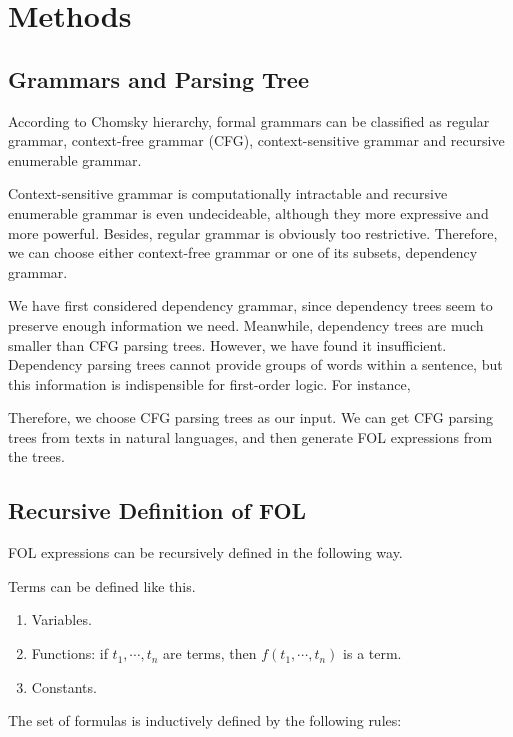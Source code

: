 \documentclass{article}
\begin{document}
\section{Methods}{
	\subsection{Grammars and Parsing Tree}{
		According to Chomsky hierarchy, formal grammars can be classified as regular grammar, context-free grammar (CFG), context-sensitive grammar and recursive enumerable grammar. 

		Context-sensitive grammar is computationally intractable and recursive enumerable grammar is even undecideable, although they more expressive and more powerful. Besides, regular grammar is obviously too restrictive. Therefore, we can choose either context-free grammar or one of its subsets, dependency grammar. 

		We have first considered dependency grammar, since dependency trees seem to preserve enough information we need. Meanwhile, dependency trees are much smaller than CFG parsing trees. However, we have found it insufficient. Dependency parsing trees cannot provide groups of words within a sentence, but this information is indispensible for first-order logic. For instance, 

		Therefore, we choose CFG parsing trees as our input. We can get CFG parsing trees from texts in natural languages, and then generate FOL expressions from the trees. 
	}

	\subsection{Recursive Definition of FOL}{
		FOL expressions can be recursively defined in the following way. 

		Terms can be defined like this. 

		\begin{enumerate}
		\item {
			Variables. 
		}

		\item {
			Functions: if $t_1, \cdots, t_n $ are terms, then $f(t_1, \cdots, t_n)$ is a term. 
		}

		\item {
			Constants. 
		}
		\end{enumerate}

		The set of formulas is inductively defined by the following rules:

}}
\end{document}
